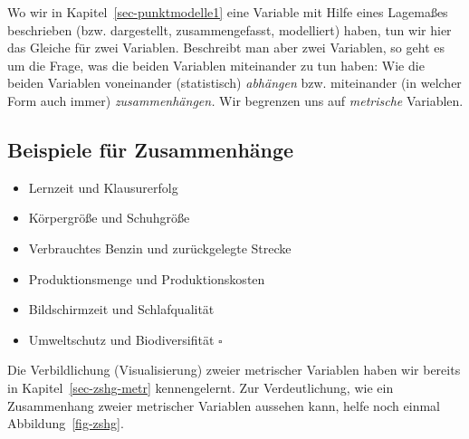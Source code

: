 \documentclass[
  letterpaper,
]{scrbook}
\providecommand{\tightlist}{%
  \setlength{\itemsep}{0pt}\setlength{\parskip}{0pt}}\usepackage{longtable,booktabs,array}
\theoremstyle{definition}
\theoremstyle{definition}
\theoremstyle{definition}
\theoremstyle{remark}
\begin{document}
Wo wir in Kapitel~\ref{sec-punktmodelle1} eine Variable mit Hilfe eines
Lagemaßes beschrieben (bzw. dargestellt, zusammengefasst, modelliert)
haben, tun wir hier das Gleiche für zwei Variablen. Beschreibt man aber
zwei Variablen, so geht es um die Frage, was die beiden Variablen
miteinander zu tun haben: Wie die beiden Variablen voneinander
(statistisch) \emph{abhängen} bzw. miteinander (in welcher Form auch
immer) \emph{zusammenhängen.} Wir begrenzen uns auf \emph{metrische}
Variablen.

\subsection{Beispiele für
Zusammenhänge}\label{beispiele-fuxfcr-zusammenhuxe4nge}

\begin{itemize}
\tightlist
\item
  Lernzeit und Klausurerfolg
\item
  Körpergröße und Schuhgröße
\item
  Verbrauchtes Benzin und zurückgelegte Strecke
\item
  Produktionsmenge und Produktionskosten
\item
  Bildschirmzeit und Schlafqualität
\item
  Umweltschutz und Biodiversifität \(\square\)
\end{itemize}

Die Verbildlichung (Visualisierung) zweier metrischer Variablen haben
wir bereits in Kapitel~\ref{sec-zshg-metr} kennengelernt. Zur
Verdeutlichung, wie ein Zusammenhang zweier metrischer Variablen
aussehen kann, helfe noch einmal Abbildung~\ref{fig-zshg}.
\end{document}

